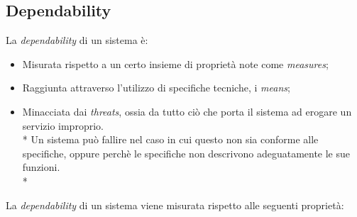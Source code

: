 \subsection{Dependability}
La \emph{dependability} di un sistema \`e:
\begin{itemize}
	\item Misurata rispetto a un certo insieme di propriet\`a note come \emph{measures};
	\item Raggiunta attraverso l'utilizzo di specifiche tecniche, i \emph{means};
	\item Minacciata dai \emph{threats}, ossia da tutto ci\`o che porta il sistema ad erogare un servizio improprio.\\*
	Un sistema pu\`o fallire nel caso in cui questo non sia conforme alle specifiche, oppure perch\`e le specifiche non descrivono adeguatamente le sue funzioni.\\*
\end{itemize}
La \emph{dependability} di un sistema viene misurata rispetto alle seguenti propriet\`a:
